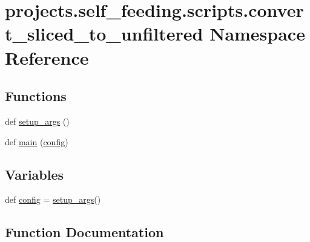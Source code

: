 \hypertarget{namespaceprojects_1_1self__feeding_1_1scripts_1_1convert__sliced__to__unfiltered}{}\section{projects.\+self\+\_\+feeding.\+scripts.\+convert\+\_\+sliced\+\_\+to\+\_\+unfiltered Namespace Reference}
\label{namespaceprojects_1_1self__feeding_1_1scripts_1_1convert__sliced__to__unfiltered}
\subsection*{Functions}
\begin{DoxyCompactItemize}
\item 
def \hyperlink{namespaceprojects_1_1self__feeding_1_1scripts_1_1convert__sliced__to__unfiltered_a13c1e69c48c191e9cc6f8d257b79152d}{setup\+\_\+args} ()
\item 
def \hyperlink{namespaceprojects_1_1self__feeding_1_1scripts_1_1convert__sliced__to__unfiltered_a552f368b316e70524ec9118b03841486}{main} (\hyperlink{namespaceprojects_1_1self__feeding_1_1scripts_1_1convert__sliced__to__unfiltered_a247e5e15adbd7a8b7c59711e1d7979d3}{config})
\end{DoxyCompactItemize}
\subsection*{Variables}
\begin{DoxyCompactItemize}
\item 
def \hyperlink{namespaceprojects_1_1self__feeding_1_1scripts_1_1convert__sliced__to__unfiltered_a247e5e15adbd7a8b7c59711e1d7979d3}{config} = \hyperlink{namespaceprojects_1_1self__feeding_1_1scripts_1_1convert__sliced__to__unfiltered_a13c1e69c48c191e9cc6f8d257b79152d}{setup\+\_\+args}()
\end{DoxyCompactItemize}


\subsection{Function Documentation}
\mbox{\label{namespaceprojects_1_1self__feeding_1_1scripts_1_1convert__sliced__to__unfiltered_a552f368b316e70524ec9118b03841486}} 

